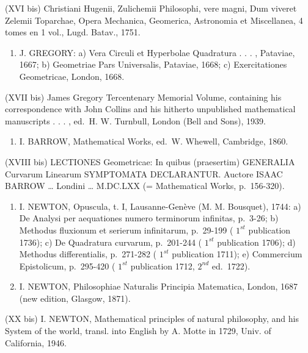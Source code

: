 (XVI bis) Christiani Hugenii, Zulichemii Philosophi, vere magni, Dum viveret Zelemii Toparchae, Opera Mechanica, Geomerica, Astronomia et Miscellanea, 4 tomes en 1 vol., Lugd. Batav., 1751.

\begin{enumerate}
\def\labelenumi{(\Roman{enumi})}
\setcounter{enumi}{16}
\tightlist
\item
  J. GREGORY: a) Vera Circuli et Hyperbolae Quadratura . . . , Pataviae, 1667; b) Geometriae Pars Universalis, Pataviae, 1668; c) Exercitationes Geometricae, London, 1668.
\end{enumerate}

(XVII bis) James Gregory Tercentenary Memorial Volume, containing his correspondence with John Collins and his hitherto unpublished mathematical manuscripts . . . , ed.~H. W. Turnbull, London (Bell and Sons), 1939.

\begin{enumerate}
\def\labelenumi{(\Roman{enumi})}
\setcounter{enumi}{17}
\tightlist
\item
  I. BARROW, Mathematical Works, ed.~W. Whewell, Cambridge, 1860.
\end{enumerate}

(XVIII bis) LECTIONES Geometricae: In quibus (praesertim) GENERALIA Curvarum Linearum SYMPTOMATA DECLARANTUR. Auctore ISAAC BARROW \ldots{} Londini \ldots{} M.DC.LXX (= Mathematical Works, p.~156-320).

\begin{enumerate}
\def\labelenumi{(\Roman{enumi})}
\setcounter{enumi}{18}
\item
  I. NEWTON, Opuscula, t. I, Lausanne-Genève (M. M. Bousquet), 1744: a) De Analysi per aequationes numero terminorum infinitas, p.~3-26; b) Methodus fluxionum et serierum infinitarum, p.~29-199 ( \(1^{st}\) publication 1736); c) De Quadratura curvarum, p.~201-244 ( \(1^{st}\) publication 1706); d) Methodus differentialis, p.~271-282 ( \(1^{st}\) publication 1711); e) Commercium Epistolicum, p.~295-420 ( \(1^{st}\) publication 1712, \(2^{nd}\) ed.~1722).
\item
  I. NEWTON, Philosophiae Naturalis Principia Matematica, London, 1687 (new edition, Glasgow, 1871).
\end{enumerate}

(XX bis) I. NEWTON, Mathematical principles of natural philosophy, and his System of the world, transl. into English by A. Motte in 1729, Univ. of California, 1946.

